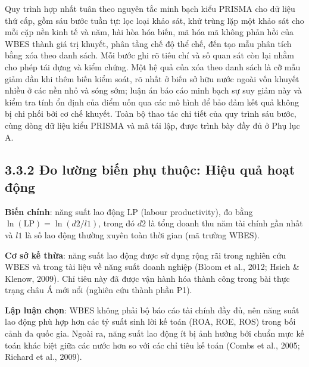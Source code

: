 \documentclass[
  a4paper,
  13pt]{extreport}
\begin{document}
Quy trình hợp nhất tuân theo nguyên tắc minh bạch kiểu PRISMA cho dữ
liệu thứ cấp, gồm sáu bước tuần tự: lọc loại khảo sát, khử trùng lặp một
khảo sát cho mỗi cặp nền kinh tế và năm, hài hòa hóa biến, mã hóa mã
không phản hồi của WBES thành giá trị khuyết, phân tầng chế độ thể chế,
đến tạo mẫu phân tích bằng xóa theo danh sách. Mỗi bước ghi rõ tiêu chí
và số quan sát còn lại nhằm cho phép tái dựng và kiểm chứng. Một hệ quả
của xóa theo danh sách là cỡ mẫu giảm dần khi thêm biến kiểm soát, rõ
nhất ở biến sở hữu nước ngoài vốn khuyết nhiều ở các nền nhỏ và sóng
sớm; luận án báo cáo minh bạch sự suy giảm này và kiểm tra tính ổn định
của điểm uốn qua các mô hình để bảo đảm kết quả không bị chi phối bởi cơ
chế khuyết. Toàn bộ thao tác chi tiết của quy trình sáu bước, cùng dòng
dữ liệu kiểu PRISMA và mã tái lập, được trình bày đầy đủ ở Phụ lục A.

\hypertarget{ux111o-lux1b0ux1eddng-biux1ebfn-phux1ee5-thuux1ed9c-hiux1ec7u-quux1ea3-houx1ea1t-ux111ux1ed9ng}{%
\subsection{3.3.2 Đo lường biến phụ thuộc: Hiệu quả hoạt
động}\label{ux111o-lux1b0ux1eddng-biux1ebfn-phux1ee5-thuux1ed9c-hiux1ec7u-quux1ea3-houx1ea1t-ux111ux1ed9ng}}

\textbf{Biến chính}: năng suất lao động \(\mathrm{LP}\) (labour
productivity), đo bằng \(\ln(\mathrm{LP}) = \ln(d2/l1)\), trong đó
\(d2\) là tổng doanh thu năm tài chính gần nhất và \(l1\) là số lao động
thường xuyên toàn thời gian (mã trường WBES).

\textbf{Cơ sở kế thừa}: năng suất lao động được sử dụng rộng rãi trong
nghiên cứu WBES và trong tài liệu về năng suất doanh nghiệp (Bloom et
al., 2012; Hsieh \& Klenow, 2009). Chỉ tiêu này đã được vận hành hóa
thành công trong bài thực trạng châu Á mới nổi (nghiên cứu thành phần
P1).

\textbf{Lập luận chọn}: WBES không phải bộ báo cáo tài chính đầy đủ, nên
năng suất lao động phù hợp hơn các tỷ suất sinh lời kế toán (ROA, ROE,
ROS) trong bối cảnh đa quốc gia. Ngoài ra, năng suất lao động ít bị ảnh
hưởng bởi chuẩn mực kế toán khác biệt giữa các nước hơn so với các chỉ
tiêu kế toán (Combs et al., 2005; Richard et al., 2009).
\end{document}
